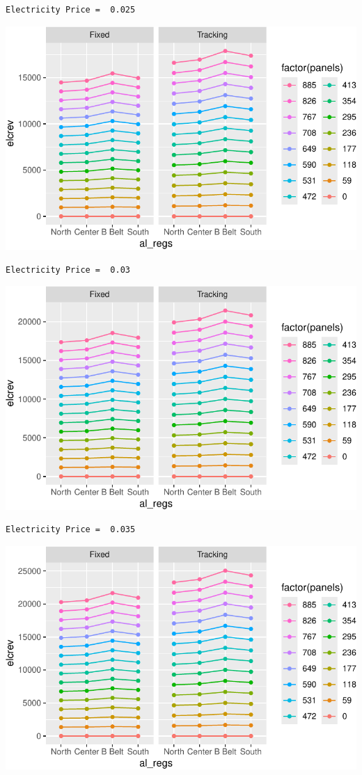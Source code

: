 \documentclass[
  letterpaper,
  DIV=11,
  numbers=noendperiod]{scrartcl}
\begin{document}
\begin{verbatim}
Electricity Price =  0.025
\end{verbatim}

\includegraphics{Simulation_files/figure-pdf/unnamed-chunk-20-4.pdf}

\begin{verbatim}
Electricity Price =  0.03
\end{verbatim}

\includegraphics{Simulation_files/figure-pdf/unnamed-chunk-20-5.pdf}

\begin{verbatim}
Electricity Price =  0.035
\end{verbatim}

\includegraphics{Simulation_files/figure-pdf/unnamed-chunk-20-6.pdf}
\end{document}
